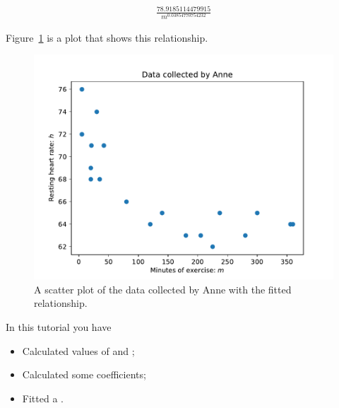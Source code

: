 \begin{equation*}
\begin{split}\displaystyle \frac{78.9185114479915}{m^{0.03854770754232}}\end{split}
\end{equation*}




Figure~\ref{fig:data_collected_by_anne_with_fitted_curve} is a plot that shows
this relationship.







\begin{figure}[!hbtp]
\begin{center}
\includegraphics[width=.7\textwidth]{./assets/data_collected_by_anne_with_fitted_curve/main.pdf}
\end{center}
\caption{A scatter plot of the data collected by Anne with the fitted
relationship.}
\label{fig:data_collected_by_anne_with_fitted_curve}
\end{figure}










\begin{note}
In this tutorial you have
\begin{itemize}
\item 

Calculated values of  and ;

\item 

Calculated some  coefficients;

\item 

Fitted a .

\end{itemize}
\end{note}





